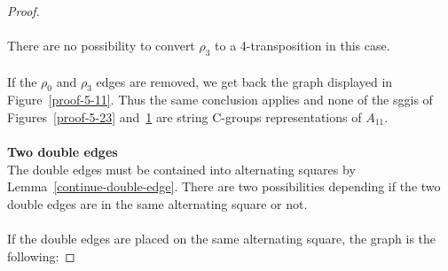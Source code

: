 \begin{proof}
\begin{figure}[H]
\begin{center}
    \caption{}
    \label{proof-5-24}
  \end{center}
\end{figure}

\paragraph{}
There are no possibility to convert $\rho_3$ to a 4-transposition in this case.

\paragraph{}
If the $\rho_0$ and $\rho_3$ edges are removed, we get back the graph displayed in Figure~\ref{proof-5-11}. Thus the same conclusion applies and none of the sggis of Figures~\ref{proof-5-23} and~\ref{proof-5-24} are string C-groups representations of $A_{11}$.

\paragraph{}
\textbf{Two double edges}\\
The double edges must be contained into alternating squares by Lemma~\ref{continue-double-edge}. There are two possibilities depending if the two double edges are in the same alternating square or not.

\paragraph{}
If the double edges are placed on the same alternating square, the graph is the following:


\end{proof}
